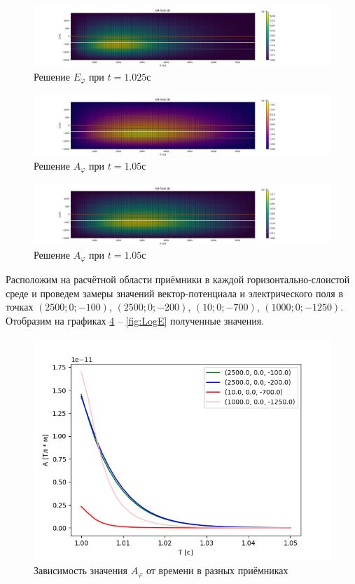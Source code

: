 \begin{figure}
	\centering
	\includegraphics[width=1.0\linewidth]{images/Answer_E_time_layer_1.0250000000000083.png}
	\caption{Решение $E_{\varphi}$ при $t = 1.025с$}
	\label{fig:E_phi_1}
\end{figure} 

\begin{figure}
	\centering
	\includegraphics[width=1.0\linewidth]{images/Answer_A_time_layer_1.05.png}
	\caption{Решение $A_{\varphi}$ при $t = 1.05с$}
	\label{fig:A_phi_2}
\end{figure}

\begin{figure}
	\centering
	\includegraphics[width=1.0\linewidth]{images/Answer_E_time_layer_1.05.png}
	\caption{Решение $A_{\varphi}$ при $t = 1.05с$}
	\label{fig:E_phi_2}
\end{figure} 

Расположим на расчётной области приёмники в каждой горизонтально-слоистой среде и проведем замеры значений вектор-потенциала и электрического поля в точках $(2500; 0; -100)$, $(2500; 0; -200)$, $(10; 0; -700)$, $(1000; 0; -1250)$. Отобразим на графиках \ref{fig:NatA} -- \ref{fig:LogE} полученные значения.

\begin{figure}
	\centering
	\includegraphics[width=0.8\linewidth]{images/Normal_A.png}
	\caption{Зависимость значения $A_{\varphi}$ от времени в разных приёмниках}
	\label{fig:NatA}
\end{figure}

